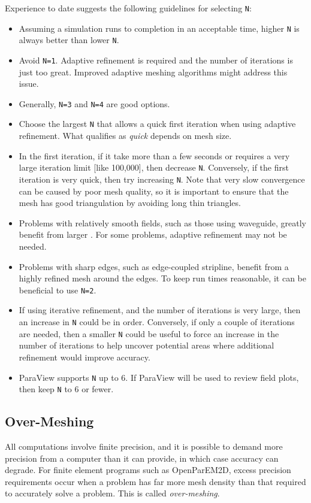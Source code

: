 \documentclass[titlepage]{article}
\renewcommand\_{\textunderscore\linebreak[1]}
\begin{document}
Experience to date suggests the following guidelines for selecting \texttt{N}:
\begin{itemize}
\item Assuming a simulation runs to completion in an acceptable time, higher \texttt{N} is always better than lower \texttt{N}.
\item Avoid \texttt{N=1}.  Adaptive refinement is required and the number of iterations is just too great.  Improved adaptive meshing algorithms might address this issue.
\item Generally, \texttt{N=3} and \texttt{N=4} are good options.
\item Choose the largest \texttt{N} that allows a quick first iteration when using adaptive refinement.  What qualifies as \textit{quick} depends on mesh size.
\item In the first iteration, if it take more than a few seconds or requires a very large iteration limit [like 100,000], then decrease \texttt{N}.  Conversely, if the first iteration is very quick, then try increasing \texttt{N}.  Note that very slow convergence can be caused by poor mesh quality, so it is important to ensure that the mesh has good triangulation by avoiding long thin triangles.
\item Problems with relatively smooth fields, such as those using waveguide, greatly benefit from larger .  For some problems, adaptive refinement may not be needed.
\item Problems with sharp edges, such as edge-coupled stripline, benefit from a highly refined mesh around the edges.  To keep run times reasonable, it can be beneficial to use \texttt{N=2}.
\item If using iterative refinement, and the number of iterations is very large, then an increase in \texttt{N} could be in order.  Conversely, if only a couple of iterations are needed, then a smaller \texttt{N} could be useful to force an increase in the number of iterations to help uncover potential areas where additional refinement would improve accuracy.
\item ParaView supports \texttt{N} up to 6.  If ParaView will be used to review field plots, then keep \texttt{N} to 6 or fewer.
\end{itemize}

\subsection{Over-Meshing}

All computations involve finite precision, and it is possible to demand more precision from a computer than it can provide, in which case accuracy can degrade.  For finite element programs such as OpenParEM2D, excess precision requirements occur when a problem has far more mesh density than that required to accurately solve a problem.  This is called \textit{over-meshing}.  
\end{document}

